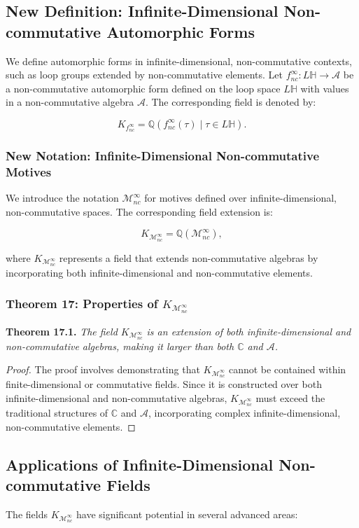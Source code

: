 \documentclass{article}
\begin{document}
\subsection{New Definition: Infinite-Dimensional Non-commutative Automorphic Forms}
We define automorphic forms in infinite-dimensional, non-commutative contexts, such as loop groups extended by non-commutative elements. Let \(f_{nc}^{\infty}: L\mathbb{H} \to \mathcal{A}\) be a non-commutative automorphic form defined on the loop space \(L\mathbb{H}\) with values in a non-commutative algebra \(\mathcal{A}\). The corresponding field is denoted by:

\[
K_{f_{nc}^{\infty}} = \mathbb{Q}(f_{nc}^{\infty}(\tau) \mid \tau \in L\mathbb{H}).
\]

\subsubsection{New Notation: Infinite-Dimensional Non-commutative Motives}
We introduce the notation \(\mathcal{M}_{nc}^{\infty}\) for motives defined over infinite-dimensional, non-commutative spaces. The corresponding field extension is:

\[
K_{\mathcal{M}_{nc}^{\infty}} = \mathbb{Q}(\mathcal{M}_{nc}^{\infty}),
\]

where \(K_{\mathcal{M}_{nc}^{\infty}}\) represents a field that extends non-commutative algebras by incorporating both infinite-dimensional and non-commutative elements.

\subsubsection{Theorem 17: Properties of \(K_{\mathcal{M}_{nc}^{\infty}}\)}
\textbf{Theorem 17.1.} \textit{The field \(K_{\mathcal{M}_{nc}^{\infty}}\) is an extension of both infinite-dimensional and non-commutative algebras, making it larger than both \(\mathbb{C}\) and \(\mathcal{A}\).}

\begin{proof}
The proof involves demonstrating that \(K_{\mathcal{M}_{nc}^{\infty}}\) cannot be contained within finite-dimensional or commutative fields. Since it is constructed over both infinite-dimensional and non-commutative algebras, \(K_{\mathcal{M}_{nc}^{\infty}}\) must exceed the traditional structures of \(\mathbb{C}\) and \(\mathcal{A}\), incorporating complex infinite-dimensional, non-commutative elements.
\end{proof}

\subsection{Applications of Infinite-Dimensional Non-commutative Fields}
The fields \(K_{\mathcal{M}_{nc}^{\infty}}\) have significant potential in several advanced areas:
\end{document}
